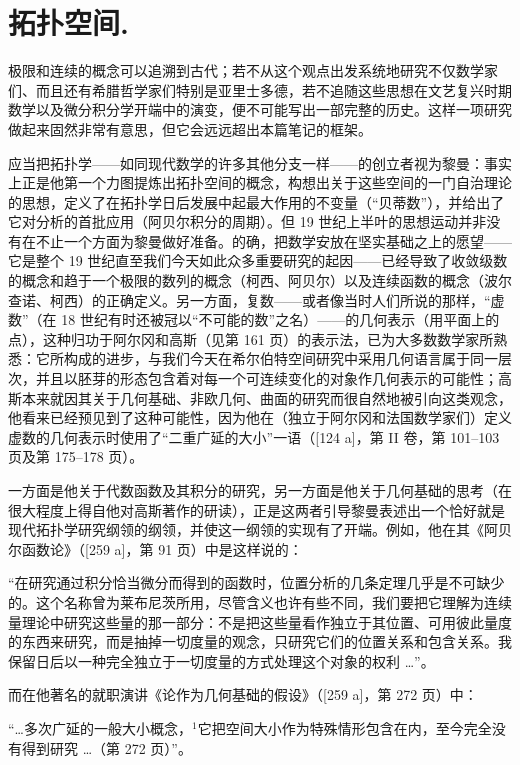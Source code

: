\chapter{拓扑空间.}

极限和连续的概念可以追溯到古代；若不从这个观点出发系统地研究不仅数学家们、而且还有希腊哲学家们特别是亚里士多德，若不追随这些思想在文艺复兴时期数学以及微分积分学开端中的演变，便不可能写出一部完整的历史。这样一项研究做起来固然非常有意思，但它会远远超出本篇笔记的框架。

应当把拓扑学——如同现代数学的许多其他分支一样——的创立者视为黎曼：事实上正是他第一个力图提炼出拓扑空间的概念，构想出关于这些空间的一门自治理论的思想，定义了在拓扑学日后发展中起最大作用的不变量（“贝蒂数”），并给出了它对分析的首批应用（阿贝尔积分的周期）。但 19 世纪上半叶的思想运动并非没有在不止一个方面为黎曼做好准备。的确，把数学安放在坚实基础之上的愿望——它是整个 19 世纪直至我们今天如此众多重要研究的起因——已经导致了收敛级数的概念和趋于一个极限的数列的概念（柯西、阿贝尔）以及连续函数的概念（波尔查诺、柯西）的正确定义。另一方面，复数——或者像当时人们所说的那样，“虚数”（在 18 世纪有时还被冠以“不可能的数”之名）——的几何表示（用平面上的点），这种归功于阿尔冈和高斯（见第 161 页）的表示法，已为大多数数学家所熟悉：它所构成的进步，与我们今天在希尔伯特空间研究中采用几何语言属于同一层次，并且以胚芽的形态包含着对每一个可连续变化的对象作几何表示的可能性；高斯本来就因其关于几何基础、非欧几何、曲面的研究而很自然地被引向这类观念，他看来已经预见到了这种可能性，因为他在（独立于阿尔冈和法国数学家们）定义虚数的几何表示时使用了“二重广延的大小”一语（{[}124 a{]}，第 II 卷，第 101–103 页及第 175–178 页）。

一方面是他关于代数函数及其积分的研究，另一方面是他关于几何基础的思考（在很大程度上得自他对高斯著作的研读），正是这两者引导黎曼表述出一个恰好就是现代拓扑学研究纲领的纲领，并使这一纲领的实现有了开端。例如，他在其《阿贝尔函数论》（{[}259 a{]}，第 91 页）中是这样说的：

“在研究通过积分恰当微分而得到的函数时，位置分析的几条定理几乎是不可缺少的。这个名称曾为莱布尼茨所用，尽管含义也许有些不同，我们要把它理解为连续量理论中研究这些量的那一部分：不是把这些量看作独立于其位置、可用彼此量度的东西来研究，而是抽掉一切度量的观念，只研究它们的位置关系和包含关系。我保留日后以一种完全独立于一切度量的方式处理这个对象的权利 \ldots{}”。

而在他著名的就职演讲《论作为几何基础的假设》（{[}259 a{]}，第 272 页）中：

“\ldots 多次广延的一般大小概念，\(^{1}\)它把空间大小作为特殊情形包含在内，至今完全没有得到研究 \ldots{}（第 272 页）”。

